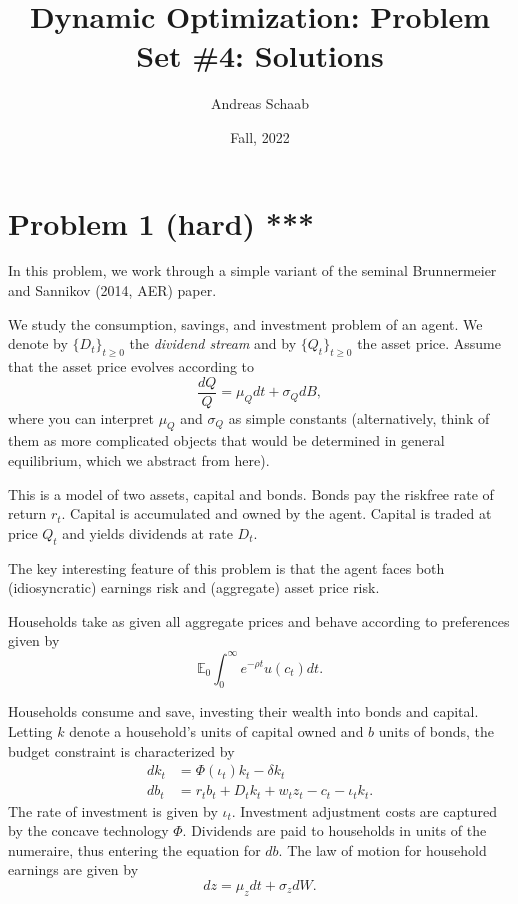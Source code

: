 \documentclass[11pt]{extarticle}
\title{Dynamic Optimization: Problem Set \#4: Solutions}
\author{Andreas Schaab}
\date{Fall, 2022}
\theoremstyle{plain}
\theoremstyle{definition}
\begin{document}
\maketitle
\thispagestyle{empty}
\setcounter{page}{0}


\vspace{10mm}
\section*{Problem 1 (hard) ***}

In this problem, we work through a simple variant of the seminal Brunnermeier and Sannikov (2014, AER) paper.

We study the consumption, savings, and investment problem of an agent. We denote by $\{ D_t \}_{t \geq 0}$ the \textit{dividend stream} and by $\{ Q_t \}_{t \geq 0}$ the asset price. Assume that the asset price evolves according to 
\begin{equation*}
	\frac{ dQ }{Q} = \mu_Q dt + \sigma_Q dB,
\end{equation*}
where you can interpret $\mu_Q$ and $\sigma_Q$ as simple constants (alternatively, think of them as more complicated objects that would be determined in general equilibrium, which we abstract from here).


This is a model of two assets, capital and bonds. Bonds pay the riskfree rate of return $r_t$. Capital is accumulated and owned by the agent. Capital is traded at price $Q_t$ and yields dividends at rate $D_t$.


The key interesting feature of this problem is that the agent faces both (idiosyncratic) earnings risk and (aggregate) asset price risk.


\vspace{10mm}
Households take as given all aggregate prices and behave according to preferences given by
\begin{equation*}
	\mathbb{E}_0 \int_0^\infty e^{- \rho t} u(c_t) dt.
\end{equation*}

Households consume and save, investing their wealth into bonds and capital. Letting $k$ denote a household's units of capital owned and $b$ units of bonds, the budget constraint is characterized by
\begin{align*}
	dk_t &= \Phi(\iota_t) k_t - \delta k_t \\
	db_t &= r_t b_t + D_t k_t + w_t z_t - c_t -  \iota_t k_t.
\end{align*}
The rate of investment is given by $\iota_t$. Investment adjustment costs are captured by the concave technology $\Phi$. Dividends are paid to households in units of the numeraire, thus entering the equation for $db$. The law of motion for household earnings are given by
\begin{equation*}
	dz = \mu_z dt + \sigma_z dW. 
\end{equation*}
\end{document}
